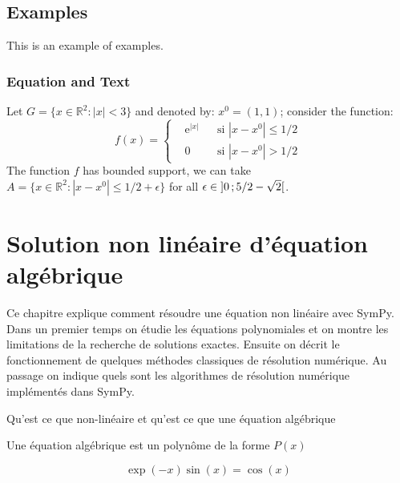 \section{Examples}

This is an example of examples.

\subsection{Equation and Text}

\begin{example}
Let $G=\{x\in\mathbb{R}^2:|x|<3\}$ and denoted by: $x^0=(1,1)$; consider the function:
\begin{equation}
f(x)=\left\{\begin{aligned} & \mathrm{e}^{|x|} & & \text{si $|x-x^0|\leq 1/2$}\\
& 0 & & \text{si $|x-x^0|> 1/2$}\end{aligned}\right.
\end{equation}
The function $f$ has bounded support, we can take $A=\{x\in\mathbb{R}^2:|x-x^0|\leq 1/2+\epsilon\}$ for all $\epsilon\in\mathopen{]}0\,;5/2-\sqrt{2}\mathclose{[}$.
\end{example}

\chapter{Solution non linéaire d'équation algébrique}
Ce chapitre explique comment résoudre une équation non linéaire avec SymPy.
Dans un premier temps on étudie les équations polynomiales et on montre les
limitations de la recherche de solutions exactes. Ensuite on décrit le fonctionnement
de quelques méthodes classiques de résolution numérique. Au passage on indique
quels sont les algorithmes de résolution numérique implémentés dans SymPy.


Qu'est ce que non-linéaire et qu'est ce que une \'equation alg\'ebrique

Une \'equation alg\'ebrique est un polyn\^ome de la forme $P(x)$

\begin{equation}
\exp(-x)\sin(x) = \cos(x)
\end{equation}
